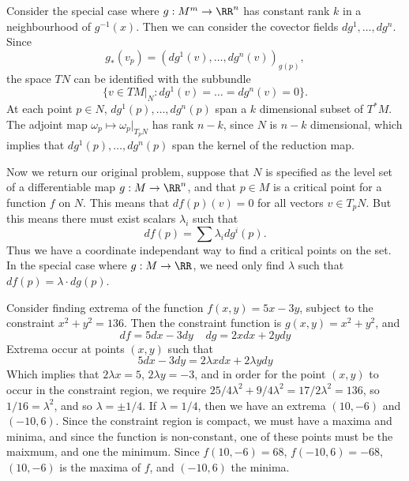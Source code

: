 Consider the special case where $g: M^m \to \RR^n$ has constant rank $k$ in a neighbourhood of $g^{-1}(x)$. Then we can consider the covector fields $dg^1,\dots,dg^n$. Since
%
\[ g_*(v_p) = (dg^1(v), \dots, dg^n(v))_{g(p)}, \]
%
the space $TN$ can be identified with the subbundle
%
\[ \{ v \in TM|_N : dg^1(v) = \dots = dg^n(v) = 0 \}. \]
%
At each point $p \in N$, $dg^1(p), \dots, dg^n(p)$ span a $k$ dimensional subset of $T^*M$. The adjoint map $\omega_p \mapsto \omega_p|_{T_pN}$ has rank $n-k$, since $N$ is $n-k$ dimensional, which implies that $dg^1(p), \dots, dg^n(p)$ span the kernel of the reduction map.

Now we return our original problem, suppose that $N$ is specified as the level set of a differentiable map $g: M \to \RR^n$, and that $p \in M$ is a critical point for a function $f$ on $N$. This means that $df(p)(v) = 0$ for all vectors $v \in T_pN$. But this means there must exist scalars $\lambda_i$ such that
%
\[ df(p) = \sum \lambda_i dg^i(p). \]
%
Thus we have a coordinate independant way to find a critical points on the set. In the special case where $g: M \to \RR$, we need only find $\lambda$ such that $df(p) = \lambda \cdot dg(p)$.

\begin{example}
    Consider finding extrema of the function $f(x,y) = 5x - 3y$, subject to the constraint $x^2 + y^2 = 136$. Then the constraint function is $g(x,y) = x^2 + y^2$, and
    \[ df = 5dx - 3dy\ \ \ \ \ dg = 2x dx + 2y dy \]
    Extrema occur at points $(x,y)$ such that
    \[ 5dx - 3dy = 2 \lambda x dx + 2 \lambda y dy \]
    Which implies that $2 \lambda x = 5$, $2 \lambda y = -3$, and in order for the point $(x,y)$ to occur in the constraint region, we require $25/4 \lambda^2 + 9/4 \lambda^2 = 17/2\lambda^2 = 136$, so $1/16 = \lambda^2$, and so $\lambda = \pm 1/4$. If $\lambda = 1/4$, then we have an extrema $(10, -6)$ and $(-10, 6)$. Since the constraint region is compact, we must have a maxima and minima, and since the function is non-constant, one of these points must be the maixmum, and one the minimum. Since $f(10,-6) = 68$, $f(-10,6) = -68$, $(10,-6)$ is the maxima of $f$, and $(-10,6)$ the minima.
\end{example}

